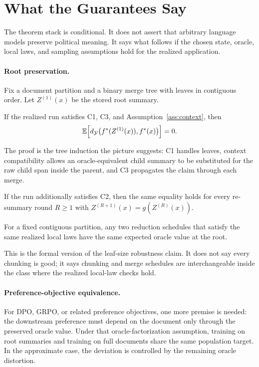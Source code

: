 \section{What the Guarantees Say}\label{sec:min-guarantees}

The theorem stack is conditional. It does not assert that arbitrary language
models preserve political meaning. It says what follows if the chosen state,
oracle, local laws, and sampling assumptions hold for the realized
application.

\paragraph{Root preservation.}
Fix a document partition and a binary merge tree with leaves in contiguous
order. Let $Z^{(1)}(x)$ be the stored root summary.

\begin{theorem}\label{thm:one-pass}
If the realized run satisfies C1, C3, and
Assumption~\ref{ass:context}, then
\[
  \mathbb{E}\!\left[
    d_{\mathcal{Y}}\big(f^\ast(Z^{(1)}(x)),f^\ast(x)\big)
  \right]=0.
\]
\end{theorem}

The proof is the tree induction the picture suggests: C1 handles leaves,
context compatibility allows an oracle-equivalent child summary to be
substituted for the raw child span inside the parent, and C3 propagates the
claim through each merge.

\begin{theorem}\label{thm:multi-round}
If the run additionally satisfies C2, then the same equality holds for every
re-summary round $R\ge 1$ with $Z^{(R+1)}(x)=g(Z^{(R)}(x))$.
\end{theorem}

\begin{corollary}\label{cor:schedule}
For a fixed contiguous partition, any two reduction schedules that satisfy
the same realized local laws have the same expected oracle value at the root.
\end{corollary}

This is the formal version of the leaf-size robustness claim. It does not say
every chunking is good; it says chunking and merge schedules are interchangeable
inside the class where the realized local-law checks hold.

\paragraph{Preference-objective equivalence.}
For DPO, GRPO, or related preference objectives, one more premise is needed:
the downstream preference must depend on the document only through the
preserved oracle value. Under that oracle-factorization assumption, training
on root summaries and training on full documents share the same population
target. In the approximate case, the deviation is controlled by the remaining
oracle distortion.

